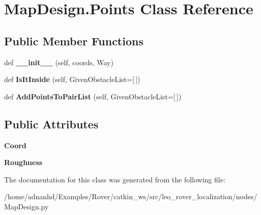 \hypertarget{classMapDesign_1_1Points}{}\section{Map\+Design.\+Points Class Reference}
\label{classMapDesign_1_1Points}
\subsection*{Public Member Functions}
\begin{DoxyCompactItemize}
\item 
\mbox{\label{classMapDesign_1_1Points_ab17adbaa191fa0dfba22f1162693760b}} 
def {\bfseries \+\_\+\+\_\+init\+\_\+\+\_\+} (self, coords, Way)
\item 
\mbox{\label{classMapDesign_1_1Points_a4838d0768aa997c969734a67aee08fca}} 
def {\bfseries Is\+It\+Inside} (self, Given\+Obstacle\+List=\mbox{[}$\,$\mbox{]})
\item 
\mbox{\label{classMapDesign_1_1Points_a7b4479a5847dca344ef902f56cad7831}} 
def {\bfseries Add\+Points\+To\+Pair\+List} (self, Given\+Obstacle\+List=\mbox{[}$\,$\mbox{]})
\end{DoxyCompactItemize}
\subsection*{Public Attributes}
\begin{DoxyCompactItemize}
\item 
\mbox{\label{classMapDesign_1_1Points_a494438ab13122e025d36bd22b16a5c70}} 
{\bfseries Coord}
\item 
\mbox{\label{classMapDesign_1_1Points_a01100dbd216dd459decabf9949aed8a1}} 
{\bfseries Roughness}
\end{DoxyCompactItemize}


The documentation for this class was generated from the following file\+:\begin{DoxyCompactItemize}
\item 
/home/adnanhd/\+Examples/\+Rover/catkin\+\_\+ws/src/leo\+\_\+rover\+\_\+localization/nodes/Map\+Design.\+py\end{DoxyCompactItemize}
